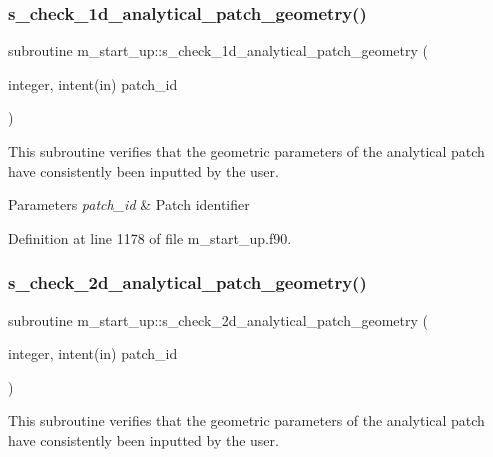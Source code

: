 \subsubsection{\texorpdfstring{s\+\_\+check\+\_\+1d\+\_\+analytical\+\_\+patch\+\_\+geometry()}{s\_check\_1d\_analytical\_patch\_geometry()}}
{\footnotesize\ttfamily subroutine m\+\_\+start\+\_\+up\+::s\+\_\+check\+\_\+1d\+\_\+analytical\+\_\+patch\+\_\+geometry (\begin{DoxyParamCaption}\item[{integer, intent(in)}]{patch\+\_\+id }\end{DoxyParamCaption})}



This subroutine verifies that the geometric parameters of the analytical patch have consistently been inputted by the user. 


\begin{DoxyParams}{Parameters}
{\em patch\+\_\+id} & Patch identifier \\
\hline
\end{DoxyParams}


Definition at line 1178 of file m\+\_\+start\+\_\+up.\+f90.

\mbox{\label{namespacem__start__up_a0acb93e848d6dd38e617d4870a9b9261}} 
\subsubsection{\texorpdfstring{s\+\_\+check\+\_\+2d\+\_\+analytical\+\_\+patch\+\_\+geometry()}{s\_check\_2d\_analytical\_patch\_geometry()}}
{\footnotesize\ttfamily subroutine m\+\_\+start\+\_\+up\+::s\+\_\+check\+\_\+2d\+\_\+analytical\+\_\+patch\+\_\+geometry (\begin{DoxyParamCaption}\item[{integer, intent(in)}]{patch\+\_\+id }\end{DoxyParamCaption})}



This subroutine verifies that the geometric parameters of the analytical patch have consistently been inputted by the user. 


